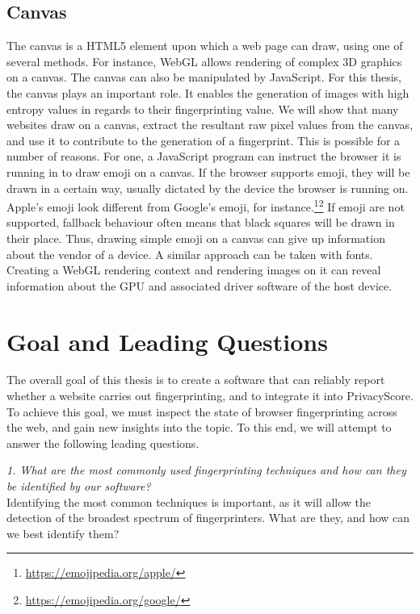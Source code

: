 \documentclass[
    fontsize=12pt,
    headings=small,
    parskip=half,
    bibliography=totoc,
    numbers=noenddot,
    open=any
    ]{scrreprt}
\begin{document}
\subsection{Canvas}
\label{fundamentals:canvas}
The canvas \cite{w3ccanvas} is a HTML5 element upon which a web page can draw,
using one of several methods. For instance, WebGL allows rendering of complex
3D graphics on a canvas.
The canvas can also be manipulated by JavaScript. For this thesis,
the canvas plays an important role. It enables the generation
of images with high entropy values in regards to their fingerprinting value.
We will show that many websites draw on a canvas, extract the resultant raw pixel
values from the canvas, and use it to contribute to the generation of a fingerprint.
This is possible for a number of reasons. For one, a JavaScript program
can instruct the browser it is running in to draw emoji on a canvas.
If the browser supports emoji, they will be drawn in a certain way, usually dictated
by the device the browser is running on. Apple's emoji look different from Google's
emoji, for instance.\footnote{\url{https://emojipedia.org/apple/}}\footnote{\url{https://emojipedia.org/google/}}
If emoji are not supported, fallback behaviour often means that black squares will
be drawn in their place.
Thus, drawing simple emoji on a canvas can give up information about the vendor of a device.
A similar approach can be taken with fonts.
Creating a WebGL rendering context and rendering images on it can reveal
information about the GPU and associated driver software of the host device.


\section{Goal and Leading Questions}
\label{sec:goal}
The overall goal of this thesis is to create a software that can reliably report whether a website carries out
fingerprinting, and to integrate it into PrivacyScore. To achieve this goal,
we must inspect the state of browser fingerprinting across the web, and gain new insights into the topic.
To this end, we will attempt to answer the following leading questions.

\textit{1. What are the most commonly used fingerprinting techniques and how can they be identified by our software?}\\
Identifying the most common techniques is important, as it will allow the detection of the broadest spectrum
of fingerprinters. What are they, and how can we best identify them?
\end{document}
